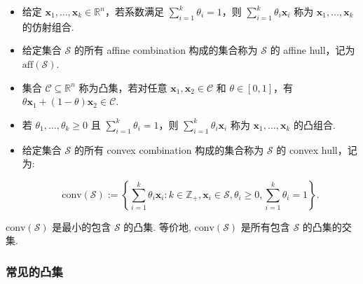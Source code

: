 \begin{defblock}
\begin{itemize}
\item {}给定 $\bm{x}_1, \ldots, \bm{x}_k \in \mathbb{R}^n$，若系数满足 $\sum_{i=1}^k \theta_i = 1$，则 $\sum_{i=1}^k \theta_i \bm{x}_i$ 称为 $\bm{x}_1, \ldots, \bm{x}_k$ 的仿射组合.


\item {}给定集合 $\mathcal{S}$ 的所有 affine combination 构成的集合称为 $\mathcal{S}$ 的 affine hull，记为 $\text{aff}(\mathcal{S})$.


\item {}集合 $\mathcal{C} \subseteq \mathbb{R}^n$ 称为凸集，若对任意 $\bm{x}_1, \bm{x}_2 \in \mathcal{C}$ 和 $\theta \in [0,1]$，有 $\theta \bm{x}_1 + (1-\theta) \bm{x}_2 \in \mathcal{C}$.


\item {}若 $\theta_1, \ldots, \theta_k \geq 0$ 且 $\sum_{i=1}^k \theta_i = 1$，则 $\sum_{i=1}^k \theta_i \bm{x}_i$ 称为 $\bm{x}_1, \ldots, \bm{x}_k$ 的凸组合.


\item {}给定集合 $\mathcal{S}$ 的所有 convex combination 构成的集合称为 $\mathcal{S}$ 的 convex hull，记为:

\[
\text{conv}(\mathcal{S}) := \left\{\sum_{i=1}^k \theta_i \bm{x}_i: k \in \mathbb{Z}_+, \bm{x}_i \in \mathcal{S}, \theta_i \geq 0, \sum_{i=1}^k \theta_i = 1\right\}.
\]


\end{itemize}

\end{defblock}


\begin{propositionblock}{}
$\text{conv}(\mathcal{S})$ 是最小的包含 $\mathcal{S}$ 的凸集. 等价地, $\text{conv}(\mathcal{S})$ 是所有包含 $\mathcal{S}$ 的凸集的交集.

\end{propositionblock}

\subsubsection{常见的凸集}


